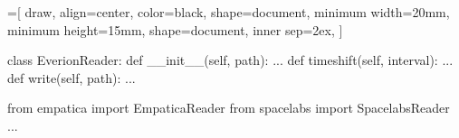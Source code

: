 \documentclass[aspectratio=169,handout]{beamer}
\begin{document}
\newcommand{\FTdir}{}
\def\FTdir(#1,#2,#3){%
  \FTfile(#1,{{\color{black!40!white}\faFolderOpen}\hspace{0.2em}#3})
  (tmp.west)++(0.8em,-0.4em)node(#2){}
  (tmp.west)++(1.5em,0)
  ++(0,-1.3em)
}

\newcommand{\FTfile}{}
\def\FTfile(#1,#2){%
  node(tmp){}
  (#1|-tmp)++(0.6em,0)
  node(tmp)[anchor=west,black]{#2}
  (#1)|-(tmp.west)
  ++(0,-1.2em)
}

\newcommand{\FTroot}{}
\def\FTroot{tmp.west}

=[%
draw,
align=center,
color=black,
shape=document,
minimum width=20mm,
minimum height=15mm,
shape=document,
inner sep=2ex,
]



\begin{myverbbox}{\reader}
class EverionReader:
    def __init__(self, path):
        ...
    def timeshift(self, interval):
        ...
    def write(self, path):
        ...
\end{myverbbox}

\begin{myverbbox}{\initpy}
from empatica import EmpaticaReader
from spacelabs import SpacelabsReader
...
\end{myverbbox}

\begin{frame}[fragile]
\end{frame}
\end{document}
